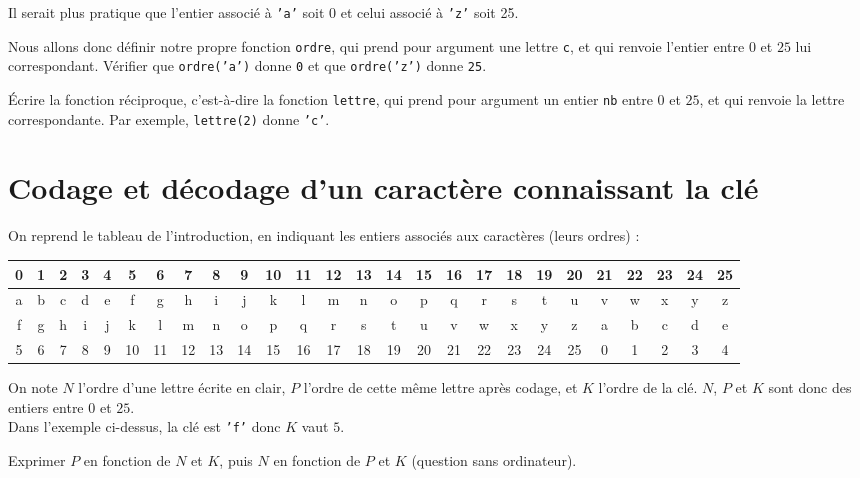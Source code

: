 Il serait plus pratique que l'entier associé à \texttt{'a'} soit $0$ et celui associé à \texttt{'z'} soit 25. 

\begin{question}
Nous allons donc définir notre propre fonction \texttt{ordre}, qui prend pour argument une lettre \texttt{c}, et qui renvoie l'entier entre $0$ et $25$ lui correspondant. Vérifier que \texttt{ordre('a')} donne \texttt{0} et que \texttt{ordre('z')} donne \texttt{25}.
\end{question}

\begin{question}
\'Ecrire la fonction réciproque, c'est-à-dire la fonction \texttt{lettre}, qui prend pour argument un entier \texttt{nb} entre $0$ et $25$, et qui renvoie la lettre correspondante. Par exemple, \texttt{lettre(2)} donne \texttt{'c'}.
\end{question}

\section*{Codage et décodage d'un caractère connaissant la clé}


On reprend le tableau de l'introduction, en indiquant les entiers associés aux caractères (leurs ordres) :

\begin{table*}[h!]
\centering
\begin{tabular}{|*{26}{c|}}
\hline
0&1&2&3&4&5&6&7&8&9&10&11&12&13&14&15&16&17&18&19&20&21&22&23&24&25\\
\hline
a&b&c&d&e&f&g&h&i&j&k&l&m&n&o&p&q&r&s&t&u&v&w&x&y&z\\
\hline
f&g&h&i&j&k&l&m&n&o&p&q&r&s&t&u&v&w&x&y&z&a&b&c&d&e\\
\hline
5&6&7&8&9&10&11&12&13&14&15&16&17&18&19&20&21&22&23&24&25&0&1&2&3&4\\
\hline
\end{tabular}
\end{table*}
\bigskip
 On note $N$ l'ordre  d'une lettre écrite en clair, $P$ l'ordre  de cette même lettre après codage, et $K$ l'ordre de la clé. $N$, $P$ et $K$ sont donc des entiers entre $0$ et $25$.\\
 Dans l'exemple ci-dessus,  la clé est \texttt{'f'} donc $K$ vaut $5$.\\

\begin{question}
 Exprimer $P$ en fonction de $N$ et $K$, puis $N$ en fonction de $P$ et $K$ (question sans ordinateur).
\end{question}


